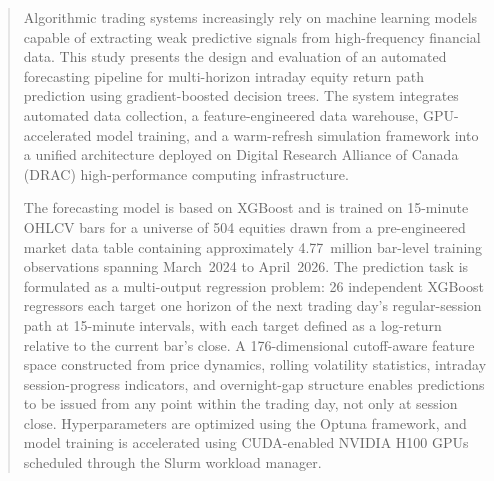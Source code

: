 \documentclass[conference]{IEEEtran}
\begin{document}
\maketitle



\begin{abstract}
Algorithmic trading systems increasingly rely on machine learning models capable of extracting weak predictive signals from high-frequency financial data. This study presents the design and evaluation of an automated forecasting pipeline for multi-horizon intraday equity return path prediction using gradient-boosted decision trees. The system integrates automated data collection, a feature-engineered data warehouse, GPU-accelerated model training, and a warm-refresh simulation framework into a unified architecture deployed on Digital Research Alliance of Canada (DRAC) high-performance computing infrastructure.

The forecasting model is based on XGBoost and is trained on 15-minute OHLCV bars for a universe of 504 equities drawn from a pre-engineered market data table containing approximately 4.77~million bar-level training observations spanning March~2024 to April~2026. The prediction task is formulated as a multi-output regression problem: 26 independent XGBoost regressors each target one horizon of the next trading day's regular-session path at 15-minute intervals, with each target defined as a log-return relative to the current bar's close. A 176-dimensional cutoff-aware feature space constructed from price dynamics, rolling volatility statistics, intraday session-progress indicators, and overnight-gap structure enables predictions to be issued from any point within the trading day, not only at session close. Hyperparameters are optimized using the Optuna framework, and model training is accelerated using CUDA-enabled NVIDIA H100 GPUs scheduled through the Slurm workload manager.


\end{abstract}
\end{document}
